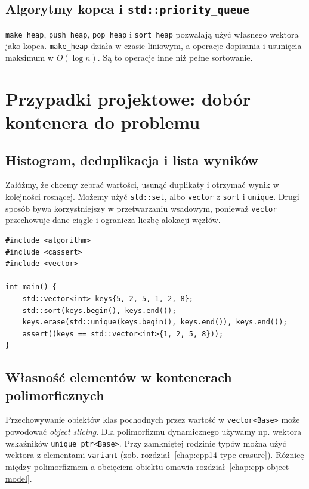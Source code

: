 \subsection{Algorytmy kopca i \texttt{std::priority\_queue}}

\texttt{make\_heap}, \texttt{push\_heap}, \texttt{pop\_heap} i
\texttt{sort\_heap} pozwalają użyć własnego wektora jako kopca.
\texttt{make\_heap} działa w czasie liniowym, a operacje dopisania i
usunięcia maksimum w $O(\log n)$. Są to operacje inne niż pełne sortowanie.

\section{Przypadki projektowe: dobór kontenera do problemu}
\label{sec:cpp13-use-cases}

\subsection{Histogram, deduplikacja i lista wyników}

Załóżmy, że chcemy zebrać wartości, usunąć duplikaty i otrzymać
wynik w kolejności rosnącej. Możemy użyć \texttt{std::set}, albo
\texttt{vector} z \texttt{sort} i \texttt{unique}. Drugi sposób bywa
korzystniejszy w przetwarzaniu wsadowym, ponieważ \texttt{vector}
przechowuje dane ciągle i ogranicza liczbę alokacji węzłów.

\begin{lstlisting}[caption={Deduplikacja przez sort i unique (C++11); kompletny program.}]
#include <algorithm>
#include <cassert>
#include <vector>

int main() {
    std::vector<int> keys{5, 2, 5, 1, 2, 8};
    std::sort(keys.begin(), keys.end());
    keys.erase(std::unique(keys.begin(), keys.end()), keys.end());
    assert((keys == std::vector<int>{1, 2, 5, 8}));
}
\end{lstlisting}

\subsection{Własność elementów w kontenerach polimorficznych}

Przechowywanie obiektów klas pochodnych przez wartość w
\texttt{vector<Base>} może powodować \emph{object slicing}. Dla
polimorfizmu dynamicznego używamy np. wektora wskaźników
\texttt{unique\_ptr<Base>}. Przy zamkniętej rodzinie typów można użyć
wektora z elementami \texttt{variant} (zob. rozdział~\ref{chap:cpp14-type-erasure}).
Różnicę między polimorfizmem a obcięciem obiektu omawia
rozdział~\ref{chap:cpp-object-model}.

